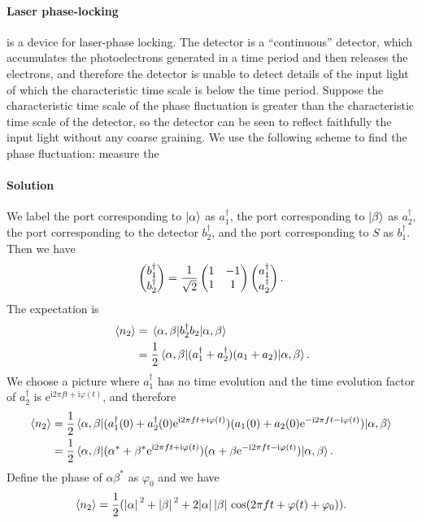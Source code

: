 \documentclass[hyperref, a4paper]{article}
\newcommand*{\ii}{\mathrm{i}}
\newcommand*{\ee}{\mathrm{e}}
\begin{document}
\paragraph{Laser phase-locking}  is a device for laser-phase locking. 
The detector is a ``continuous'' detector, which accumulates the photoelectrons generated in a time period and then releases the 
electrons, and therefore the detector is unable to detect details of the input light of which the characteristic time scale is 
below the time period. Suppose the characteristic time scale of the phase fluctuation is greater than the characteristic time scale of the detector, so the detector can be seen to reflect faithfully the input light without any coarse graining.
We use the following scheme to find the phase fluctuation: measure the  

\paragraph{Solution} We label the port corresponding to $\ket{\alpha}$ as $a^\dagger_1$, the port corresponding to $\ket{\beta}$ as $a^\dagger_2$, the port corresponding to the detector $b^\dagger_2$, and the port corresponding to $S$ as $b^\dagger_1$.
Then we have 
\[
    \pmqty{b^\dagger_1 \\ b^\dagger_2} = \frac{1}{\sqrt{2}} \pmqty{1 & -1 \\ 1 & 1} \pmqty{ a^\dagger_1 \\ a^\dagger_2 }.
\]
The expectation is 
\[
    \begin{aligned}
        \expval*{n_2} &= \mel*{\alpha, \beta}{b_2^\dagger b_2}{\alpha, \beta} \\
        &= \frac{1}{2} \mel*{\alpha, \beta}{ (a_1^\dagger + a_2^\dagger) (a_1 + a_2) }{\alpha, \beta} .
    \end{aligned}
\]
We choose a picture where $a_1^\dagger$ has no time evolution and the time evolution factor of $a_2^\dagger$ is $\ee^{\ii 2 \pi f t + \ii \varphi(t)}$, and therefore
\[
    \begin{aligned}
        \expval{n_2} &= \frac{1}{2} \mel*{\alpha, \beta}{ (a_1^\dagger(0) + a_2^\dagger(0) \ee^{\ii 2 \pi f t + \ii \varphi(t)}) (a_1(0) + a_2(0) \ee^{- \ii 2 \pi f t - \ii \varphi(t)}) }{\alpha, \beta} \\
        &= \frac{1}{2} \mel*{\alpha, \beta}{ (\alpha^* + \beta^* \ee^{\ii 2 \pi f t + \ii \varphi(t)}) (\alpha + \beta \ee^{- \ii 2 \pi f t - \ii \varphi(t)}) }{\alpha, \beta} .
    \end{aligned}
\]
Define the phase of $\alpha \beta^*$ as $\varphi_0$ and we have 
\begin{equation}
    \expval{n_2} = \frac{1}{2} (\abs*{\alpha}^2 + \abs*{\beta}^2 + 2 \abs*{\alpha} \abs*{\beta} \cos(2 \pi f t + \varphi(t) + \varphi_0)).
\end{equation}
\end{document}
